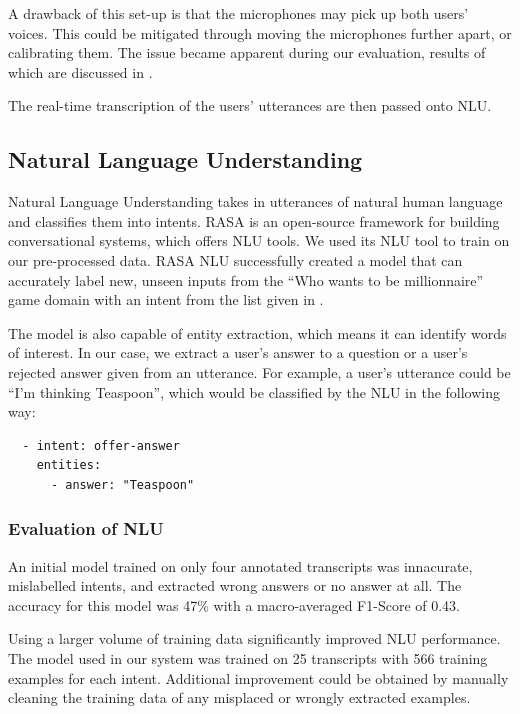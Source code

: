 \documentclass[hidelinks, 11pt]{article}
\begin{document}
A drawback of this set-up is that the microphones may pick up both users' voices. This could be mitigated through moving the microphones further apart, or calibrating them. The issue became apparent during our evaluation, results of which are discussed in .

The real-time transcription of the users' utterances are then passed onto NLU.

\subsection{Natural Language Understanding}
\label{subsec:nlu}

Natural Language Understanding takes in utterances of natural human language and classifies them into intents. RASA is an open-source framework for building conversational systems, which offers NLU tools. We used its NLU tool to train on our pre-processed data. RASA NLU successfully created a model that can accurately label new, unseen inputs from the ``Who wants to be millionnaire'' game domain with an intent from the list given in .

The model is also capable of entity extraction, which means it can identify words of interest. In our case, we extract a user's answer to a question or a user's rejected answer given from an utterance. For example, a user's utterance could be ``I'm thinking Teaspoon'', which would be classified by the NLU in the following way:

\begin{verbatim}
  - intent: offer-answer
    entities:
      - answer: "Teaspoon"
\end{verbatim}

\subsubsection{Evaluation of NLU}
\label{subsec:NLU_evaluation}

An initial model trained on only four annotated transcripts was innacurate, mislabelled intents, and extracted wrong answers or no answer at all. The accuracy for this model was 47\% with a macro-averaged F1-Score of 0.43.

Using a larger volume of training data significantly improved NLU performance. The model used in our system was trained on 25 transcripts with 566 training examples for each intent. Additional improvement could be obtained by manually cleaning the training data of any misplaced or wrongly extracted examples.
\end{document}
